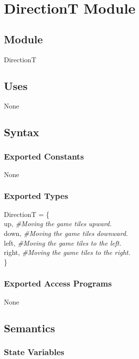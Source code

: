 \documentclass[12pt]{article}
\begin{document}
\newpage

\section* {DirectionT Module}

\subsection*{Module}

DirectionT

\subsection* {Uses}

None

\subsection* {Syntax}

\subsubsection* {Exported Constants}

None

\subsubsection* {Exported Types}

DirectionT = \{\\
    up, \textit{\#Moving the game tiles upward.}\\
    down, \textit{\#Moving the game tiles downward.}\\
    left, \textit{\#Moving the game tiles to the left.}\\
    right, \textit{\#Moving the game tiles to the right.}\\
\}

\subsubsection* {Exported Access Programs}

None

\subsection* {Semantics}

\subsubsection* {State Variables}
\end{document}
